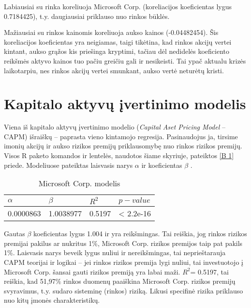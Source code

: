 \documentclass[12pt, a14paper, lithuanian]{article}
\begin{document}
Labiausiai su rinka koreliuoja Microsoft Corp. (koreliacijos koeficientas lygus 0.7184425), t.y. daugiausiai priklauso nuo rinkos būklės.

Mažiausiai su rinkos kainomis koreliuoja aukso kainos (-0.04482454). Šis koreliacijos koeficientas yra neigiamas, taigi tikėtina, kad rinkos akcijų vertei kintant, aukso grąžos kis priešinga kryptimi, tačiau dėl nedidelės koeficiento reikšmės aktyvo kainos tuo pačiu greičiu gali ir nesikeisti. Tai ypač aktualu krizės laikotarpiu, nes rinkos akcijų vertei smunkant, aukso vertė neturėtų kristi.



\newpage
\section{Kapitalo aktyvų įvertinimo modelis}

Viena iš kapitalo aktyvų įvertinimo modelio (\textit{Capital Aset Pricing Model} -- CAPM) išraiškų -- paprasta vieno kintamojo regresija. Pasinaudojus ja, tirsime imonių akcijų ir aukso rizikos premijų priklausomybę nuo rinkos rizikos premijų. Visos R paketo komandos ir lentelės, naudotos šiame skyriuje, pateiktos \ref{B 1} priede.
Modeliuose pateiktas laisvasis narys $ \alpha $   ir koeficientas  $ \beta $ .


\begin{table}[ht]
\begin{center}
    \begin{tabular}{ | l | l | l | l | }
    \hline
    $ \alpha $ & $ \beta $ & $ R^2 $ & $ p-value $  \\
    \hline
	0.0000863 & 1.0038977 &  0.5197 & < 2.2e-16\\
	\hline
    \end{tabular}
\end{center}
\caption{Microsoft Corp. modelis}
\end{table}

Gautas $\beta$ koeficientas lygus 1.004 ir yra reikšmingas. Tai reiškia, jog rinkos rizikos premijai pakilus ar nukritus 1\%, Microsoft Corp. rizikos premijos taip pat pakils 1\%. Laisvasis narys beveik lygus nuliui ir nereikšmingas,
tai neprieštarauja CAPM teorijai ir logikai -- jei rinkos rizikos premija lygi nuliui, tai investuotojo į Microsoft Corp. šansai gauti rizikos premiją yra labai maži.
$R^2$= 0.5197, tai reiškia, kad 51,97\% rinkos duomenų paaiškina Microsoft Corp. rizikos premijų svyravimus, t.y. sudaro sisteminę (rinkos) riziką. Likusi specifinė rizika priklauso nuo kitų įmonės charakteristikų.
\end{document}
